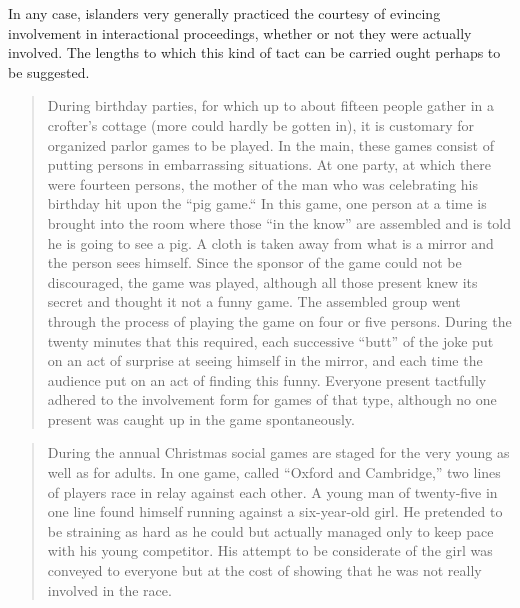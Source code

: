 \documentclass[openany,nobib]{tufte-book}
\begin{document}
In any case, islanders very generally practiced the courtesy of evincing
involvement in interactional proceedings, whether or not they were
actually involved. The lengths to which this kind of tact can be carried
ought perhaps to be suggested.

\begin{quote}
During birthday parties, for which up to about fifteen people gather in
a crofter's cottage (more could hardly be gotten in), it is customary
for organized parlor games to be played. In the main, these games
consist of putting persons in embarrassing situations. At one party, at
which there were fourteen persons, the mother of the man who was
celebrating his birthday hit upon the ``pig game.`` In this game, one
person at a time is brought into the room where those ``in the know''
are assembled and is told he is going to see a pig. A cloth is taken
away from what is a mirror and the person sees himself. Since the
sponsor of the game could not be discouraged, the game was played,
although all those present knew its secret and thought it not a funny
game. The assembled group went through the process of playing the game
on four or five persons. During the twenty minutes that this required,
each successive ``butt'' of the joke put on an act of surprise at seeing
himself in the mirror, and each time the audience put on an act of
finding this funny. Everyone present tactfully adhered to the
involvement form for games of that type, although no one present was
caught up in the game spontaneously.
\end{quote}
\newpage
\begin{quote}
During the annual Christmas social games are staged for the very young
as well as for adults. In one game, called ``Oxford and Cambridge,'' two
lines of players race in relay against each other. A young man of
twenty-five in one line found himself running against a six-year-old
girl. He pretended to be straining as hard as he could but actually
managed only to keep pace with his young competitor. His attempt to be
considerate of the girl was conveyed to everyone but at the cost of
showing that he was not really involved in the race.
\end{quote}
\end{document}
